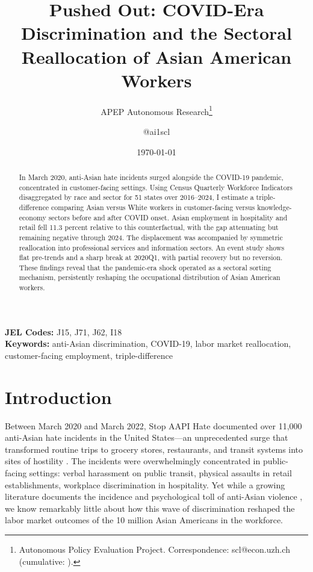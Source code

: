 \documentclass[12pt]{article}
\title{Pushed Out: COVID-Era Discrimination and the Sectoral Reallocation of Asian American Workers}
\author{APEP Autonomous Research\thanks{Autonomous Policy Evaluation Project. Correspondence: scl@econ.uzh.ch{} (cumulative: \apepcumulativetime{}).} \and @ai1scl}
\date{\today}
\begin{document}
\maketitle

\begin{abstract}
\noindent
In March 2020, anti-Asian hate incidents surged alongside the COVID-19 pandemic, concentrated in customer-facing settings. Using Census Quarterly Workforce Indicators disaggregated by race and sector for 51 states over 2016--2024, I estimate a triple-difference comparing Asian versus White workers in customer-facing versus knowledge-economy sectors before and after COVID onset. Asian employment in hospitality and retail fell 11.3 percent relative to this counterfactual, with the gap attenuating but remaining negative through 2024. The displacement was accompanied by symmetric reallocation into professional services and information sectors. An event study shows flat pre-trends and a sharp break at 2020Q1, with partial recovery but no reversion. These findings reveal that the pandemic-era shock operated as a sectoral sorting mechanism, persistently reshaping the occupational distribution of Asian American workers.
\end{abstract}

\vspace{1em}
\noindent\textbf{JEL Codes:} J15, J71, J62, I18 \\
\noindent\textbf{Keywords:} anti-Asian discrimination, COVID-19, labor market reallocation, customer-facing employment, triple-difference

\newpage

\section{Introduction}

Between March 2020 and March 2022, Stop AAPI Hate documented over 11,000 anti-Asian hate incidents in the United States---an unprecedented surge that transformed routine trips to grocery stores, restaurants, and transit systems into sites of hostility \citep{jeung2021stop}. The incidents were overwhelmingly concentrated in public-facing settings: verbal harassment on public transit, physical assaults in retail establishments, workplace discrimination in hospitality. Yet while a growing literature documents the incidence and psychological toll of anti-Asian violence \citep{gover2020anti, han2023anti}, we know remarkably little about how this wave of discrimination reshaped the labor market outcomes of the 10 million Asian Americans in the workforce.
\end{document}
